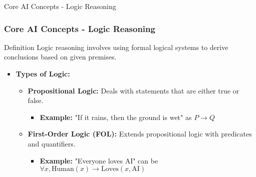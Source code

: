 \documentclass[aspectratio=169]{beamer}
\begin{document}
\begin{frame}[fragile]{Core AI Concepts - Logic Reasoning}
    \frametitle{Core AI Concepts - Logic Reasoning}
    \begin{block}{Definition}
        Logic reasoning involves using formal logical systems to derive conclusions based on given premises.
    \end{block}

    \begin{itemize}
        \item \textbf{Types of Logic:}
        \begin{itemize}
            \item \textbf{Propositional Logic:} Deals with statements that are either true or false.
                \begin{itemize}
                    \item \textbf{Example:} "If it rains, then the ground is wet" as \( P \to Q \)
                \end{itemize}
            \item \textbf{First-Order Logic (FOL):} Extends propositional logic with predicates and quantifiers.
                \begin{itemize}
                    \item \textbf{Example:} "Everyone loves AI" can be \( \forall x, \text{Human}(x) \to \text{Loves}(x, \text{AI}) \)
                \end{itemize}
        \end{itemize}
    \end{itemize}
\end{frame}
\end{document}
